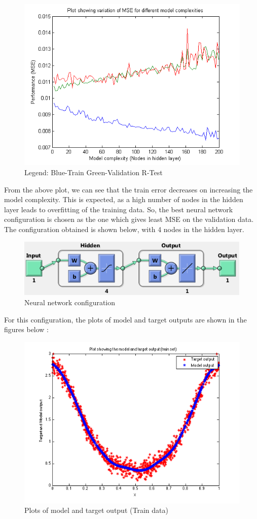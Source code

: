 \documentclass{article}
\begin{document}
\begin{figure}[H]
\centering
\includegraphics[width=\linewidth]{Regression/univariate/mse.png}
\caption{Legend: Blue-Train  Green-Validation R-Test}
\end{figure}

From the above plot, we can see that the train error decreases on increasing the model complexity. This is expected, as a high number of nodes in the hidden layer leads to overfitting of the training data. So, the best neural network configuration is chosen as the one which gives least MSE on the validation data.
The configuration obtained is shown below, with 4 nodes in the hidden layer.



\begin{figure}[H]
\centering
\includegraphics[width=\linewidth]{Regression/univariate/net_config.png}
\caption{Neural network configuration}
\end{figure}

For this configuration, the plots of model and target outputs are shown in the figures below : 

\begin{figure}[H]
\centering
\includegraphics[width=0.5\linewidth]{Regression/univariate/trainOutput.png}
\caption{Plots of model and target output (Train data)}
\end{figure}
\end{document}

